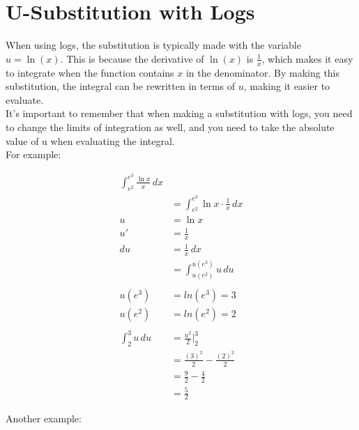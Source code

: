 \newpage

\section{U-Substitution with Logs}
\noindent When using logs, the substitution is typically made with the variable 
$u = \ln(x)$. This is because the derivative of $\ln(x)$ is $\frac{1}{x}$, which 
makes it easy to integrate when the function contains $x$ in the denominator. 
By making this substitution, the integral can be rewritten in terms of $u$, 
making it easier to evaluate.\\

\noindent It's important to remember that when making a substitution with logs, 
you need to change the limits of integration as well, and you need to take the 
absolute value of u when evaluating the integral.\\

\noindent For example:

\begin{framed}
\begin{align*}
  \int_{e^2}^{e^3} \frac{\ln x}{x} \, dx\\
  &= \int_{e^2}^{e^3} \ln x \cdot \frac{1}{x} \, dx\\
  u &= \ln x\\
  u' &= \frac{1}{x}\\
  du &= \frac{1}{x} \, dx\\
  &= \int_{u(e^2)}^{u(e^3)} u \, du\\\\
  u(e^3) &= ln(e^3) = 3\\
  u(e^2) &= ln(e^2) = 2\\\\
  \int_{2}^{3} u \, du &= \frac{u^2}{2} \biggr\rvert_{2}^{3}\\
  &= \frac{(3)^2}{2} - \frac{(2)^2}{2}\\
  &= \frac{9}{2} - \frac{4}{2}\\
  &= \frac{5}{2}
\end{align*}
\end{framed}

\newpage

\noindent Another example:

